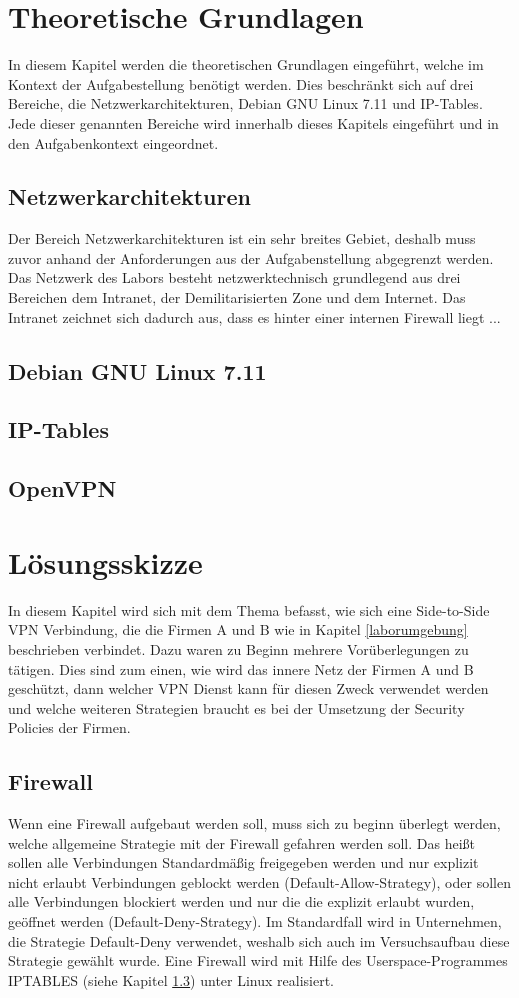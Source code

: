 \documentclass[
a4paper,     %
 headsepline, %
footsepline, %
titlepage,   %
 halfparskip,     %
 fleqn,       %
12pt         %
]{scrartcl}  %
\begin{document}
\section{Theoretische Grundlagen}
In diesem Kapitel werden die theoretischen Grundlagen eingeführt, welche im Kontext der Aufgabestellung benötigt werden. Dies beschränkt sich auf drei Bereiche, die Netzwerkarchitekturen, Debian GNU Linux 7.11 und IP-Tables. Jede dieser genannten Bereiche wird innerhalb dieses Kapitels eingeführt und in den Aufgabenkontext eingeordnet. 
\subsection{Netzwerkarchitekturen}
Der Bereich Netzwerkarchitekturen ist ein sehr breites Gebiet, deshalb muss zuvor anhand der Anforderungen aus der Aufgabenstellung abgegrenzt werden.
Das Netzwerk des Labors besteht netzwerktechnisch grundlegend aus drei Bereichen dem Intranet, der Demilitarisierten Zone und dem Internet. 
Das Intranet zeichnet sich dadurch aus, dass es hinter einer internen Firewall liegt ... 

\subsection{Debian GNU Linux 7.11}
\subsection{IP-Tables}\label{iptables}
\subsection{OpenVPN}
\section{Lösungsskizze}
In diesem Kapitel wird sich mit dem Thema befasst, wie sich eine Side-to-Side VPN Verbindung, die die Firmen A und B wie in Kapitel \ref{laborumgebung} beschrieben verbindet.
Dazu waren zu Beginn mehrere Vorüberlegungen zu tätigen. Dies sind zum einen, wie wird das innere Netz der Firmen A und B geschützt, dann welcher VPN Dienst kann für diesen Zweck verwendet werden und welche weiteren Strategien braucht es bei der Umsetzung der Security Policies der Firmen. 
\subsection{Firewall}
Wenn eine Firewall aufgebaut werden soll, muss sich zu beginn überlegt werden, welche allgemeine Strategie mit der Firewall gefahren werden soll. Das heißt sollen alle Verbindungen Standardmäßig freigegeben werden und nur explizit nicht erlaubt Verbindungen geblockt werden (Default-Allow-Strategy), oder sollen alle Verbindungen blockiert werden und nur die die explizit erlaubt wurden, geöffnet werden (Default-Deny-Strategy). Im Standardfall wird in Unternehmen, die Strategie Default-Deny verwendet, weshalb sich auch im Versuchsaufbau diese Strategie gewählt wurde. Eine Firewall wird mit Hilfe des Userspace-Programmes IPTABLES (siehe Kapitel \ref{iptables}) unter Linux realisiert. 
\end{document}
